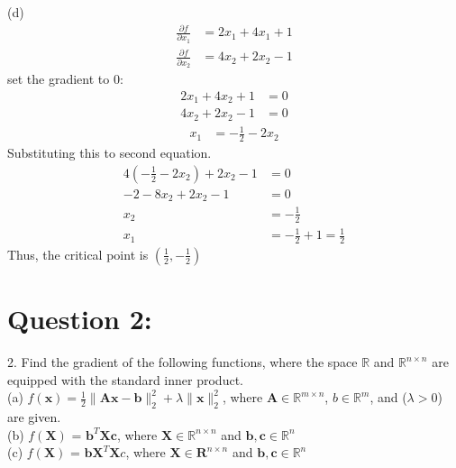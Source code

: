 \documentclass[a4paper,12pt]{article}
\newcommand{\R}{\mathbb{R}}
\begin{document}
(d)
\begin{align*}
    \frac{\partial f}{\partial x_1} &= 2x_1 + 4x_1 + 1 \\
    \frac{\partial f}{\partial x_2} &= 4x_2 + 2x_2 - 1
\end{align*}
set the gradient to 0:
\begin{align*}
    2x_1 + 4x_2 + 1 &= 0 \\
    4x_2 + 2x_2 - 1 &= 0
\end{align*}
\begin{align*}
    x_1 &= - \frac{1}{2} - 2x_2 
\end{align*}
Substituting this to second equation.
\begin{align*}
    4(- \frac{1}{2} - 2x_2) + 2x_2 - 1 &= 0 \\
    -2 - 8x_2 + 2x_2 - 1 &= 0 \\
    x_2 &= -\frac{1}{2} \\
    x_1 &= -\frac{1}{2} + 1 = \frac{1}{2}
\end{align*}
Thus, the critical point is \(\left( \frac{1}{2}, -\frac{1}{2} \right)\)





\section*{Question 2:}
2. Find the gradient of the following functions, where the space \(\R\) and \(\R^{n \times n}\) are equipped with the standard inner product. \\
(a) \(f(\bm{x}) = \frac{1}{2} \|\bm{A}\bm{x} - \bm{b}\|_2^2 + \lambda\|\bm{x}\|_2^2\), where \(\bm{A} \in \R^{m \times n}\), \(b \in \R^m\), and (\(\lambda > 0\)) are given. \\
(b) \(f(\bm{X})\) = \(\bm{b}^T\bm{X}\bm{c}\), where \(\bm{X} \in \R^{n \times n}\) and \(\bm{b}, \bm{c} \in \R^n\) \\
(c) \(f(\bm{X})\) = \(\bm{b}\bm{X}^T\bm{X}c\), where \(\bm{X} \in \bm{R}^{n \times n}\) and \(\bm{b}, \bm{c} \in \R^n\) 
\end{document}
